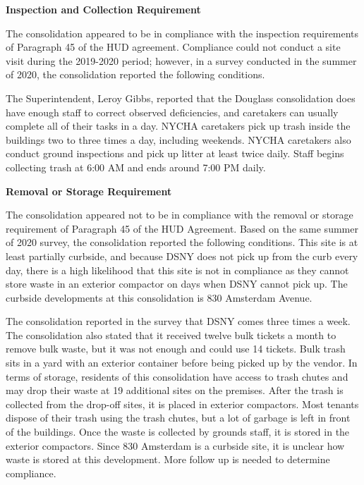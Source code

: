  

\textbf{Inspection and Collection Requirement} 

 

The consolidation appeared to be in compliance with the inspection requirements of Paragraph 45 of the HUD agreement. Compliance could not conduct a site visit during the 2019-2020 period; however, in a survey conducted in the summer of 2020, the consolidation reported the following conditions.

The Superintendent, Leroy Gibbs, reported that the Douglass consolidation does have enough staff to correct observed deficiencies, and caretakers can usually complete all of their tasks in a day. NYCHA caretakers pick up trash inside the buildings two to three times a day, including weekends. NYCHA caretakers also conduct ground inspections and pick up litter at least twice daily. Staff begins collecting trash at 6:00 AM and ends around 7:00 PM daily. 

\textbf{Removal or Storage Requirement} 

The consolidation appeared not to be in compliance with the removal or storage requirement of Paragraph  45 of the HUD Agreement. Based on the same summer of  2020 survey, the consolidation reported the following conditions. This site is at least partially curbside, and because DSNY does not pick up from the curb every day, there is a high likelihood that this site is not in compliance as they cannot store waste in an exterior compactor on days when DSNY cannot pick up. The curbside developments at this consolidation is 830 Amsterdam Avenue. 

 

The consolidation reported in the survey that DSNY comes three times a week. The consolidation also stated that it received twelve bulk tickets a month to remove bulk waste, but it was not enough and could use 14 tickets. Bulk trash sits in a yard with an exterior container before being picked up by the vendor. In terms of storage, residents of this consolidation have access to trash chutes and may drop their waste at 19 additional sites on the premises. After the trash is collected from the drop-off sites, it is placed in exterior compactors. Most tenants dispose of their trash using the trash chutes, but a lot of garbage is left in front of the buildings. Once the waste is collected by grounds staff, it is stored in the exterior compactors. Since 830 Amsterdam is a curbside site, it is unclear how waste is stored at this development. More follow up is needed to determine compliance.

